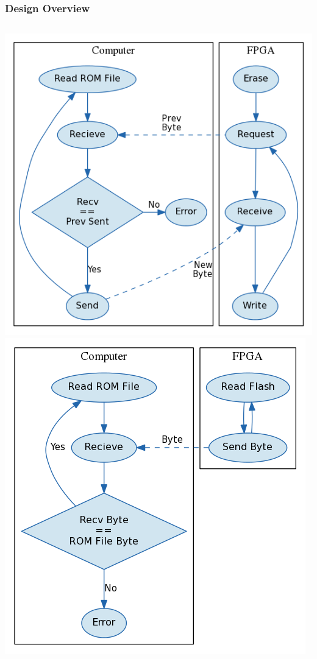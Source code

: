 \documentclass{beamer}
\begin{document}
\begin{frame}
    \frametitle{Design Overview}
    \begin{columns}[c]
        \includegraphics[width=\textwidth]{../../fpga/rom_flasher/doc/block_diagram_write.png}
        \includegraphics[width=\textwidth]{../../fpga/rom_flasher/doc/block_diagram_read.png}
    \end{columns}
\end{frame}
\end{document}
